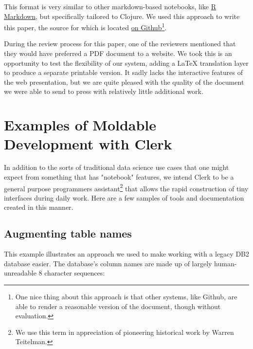 \documentclass[sigconf,screen]{acmart}
\begin{document}
This format is very similar to other markdown-based notebooks, like \href{https://rmarkdown.rstudio.com}{R Markdown}, but specifically tailored to Clojure. We used this approach to write this paper, the source for which is located \href{https://github.com/mk/clerk-px23}{on Github}\footnote{One nice thing about this approach is that other systems, like Github, are able to render a reasonable version of the document, though without evaluation.}.

During the review process for this paper, one of the reviewers mentioned that they would have preferred a PDF document to a website. We took this is an opportunity to test the flexibility of our system, adding a LaTeX translation layer to produce a separate printable version. It sadly lacks the interactive features of the web presentation, but we are quite pleased with the quality of the document we were able to send to press with relatively little additional work.

\hypertarget{examples-of-moldable-development-with-clerk}{%
\section{Examples of Moldable Development with Clerk}\label{examples-of-moldable-development-with-clerk}}

In addition to the sorts of traditional data science use cases that one might expect from something that has "notebook" features, we intend Clerk to be a general purpose programmer\textquotesingle s assistant\footnote{We use this term in appreciation of pioneering historical work by Warren Teitelman.} that allows the rapid construction of tiny interfaces during daily work. Here are a few samples of tools and documentation created in this manner.

\hypertarget{augmenting-table-names}{%
\subsection{Augmenting table names}\label{augmenting-table-names}}

This example illustrates an approach we used to make working with a legacy DB2 database easier. The database's column names are made up of largely human-unreadable 8 character sequences:
\end{document}
